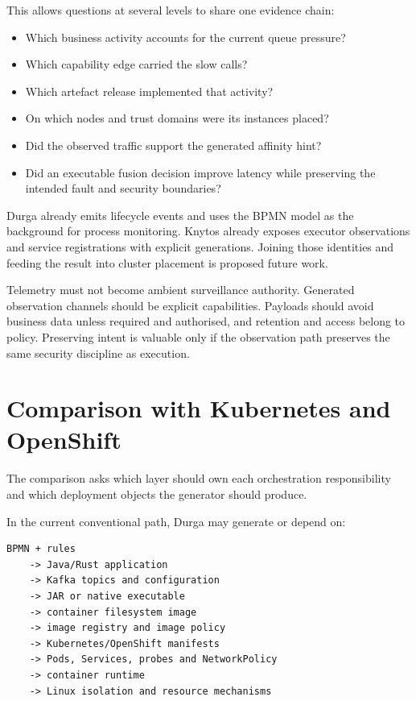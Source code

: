 This allows questions at several levels to share one evidence chain:

\begin{itemize}
    \item Which business activity accounts for the current queue pressure?
    \item Which capability edge carried the slow calls?
    \item Which artefact release implemented that activity?
    \item On which nodes and trust domains were its instances placed?
    \item Did the observed traffic support the generated affinity hint?
    \item Did an executable fusion decision improve latency while preserving
        the intended fault and security boundaries?
\end{itemize}

Durga already emits lifecycle events and uses the BPMN model as the background
for process monitoring. Knytos already exposes executor observations and
service registrations with explicit generations. Joining those identities and
feeding the result into cluster placement is proposed future work.

Telemetry must not become ambient surveillance authority. Generated observation
channels should be explicit capabilities. Payloads should avoid business data
unless required and authorised, and retention and access belong to policy.
Preserving intent is valuable only if the observation path preserves the same
security discipline as execution.

\section{Comparison with Kubernetes and OpenShift}

The comparison asks which layer should own each orchestration responsibility
and which deployment objects the generator should produce.

In the current conventional path, Durga may generate or depend on:

\begin{verbatim}
BPMN + rules
    -> Java/Rust application
    -> Kafka topics and configuration
    -> JAR or native executable
    -> container filesystem image
    -> image registry and image policy
    -> Kubernetes/OpenShift manifests
    -> Pods, Services, probes and NetworkPolicy
    -> container runtime
    -> Linux isolation and resource mechanisms
\end{verbatim}

